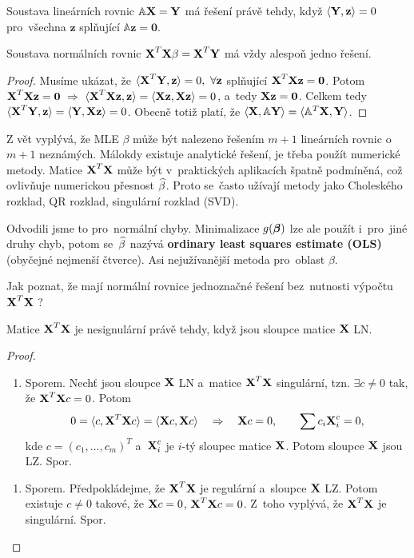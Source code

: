 \begin{lemma}
	Soustava lineárních rovnic $\mathbb{A}\textbf{X} = \textbf{Y}$ má řešení právě tehdy, když $\langle \textbf{Y},\textbf{z}\rangle = 0$ pro~všechna $\textbf{z}$ splňující $\mathbb{A}\textbf{z} = \textbf{0}$.
\end{lemma}
\begin{theorem}
	Soustava normálních rovnic $\textbf{X}^T\textbf{X}\beta = \textbf{X}^T\textbf{Y}$ má vždy alespoň jedno řešení.
	\begin{proof}
		Musíme ukázat, že $\langle \textbf{X}^T\textbf{Y},\textbf{z}\rangle = 0,~\forall\textbf{z}$ splňující $\textbf{X}^T\textbf{X}\textbf{z} = \textbf{0}$. Potom
		 $\textbf{X}^T\textbf{X}\textbf{z} = \textbf{0}~\Rightarrow~\langle \textbf{X}^T\textbf{X}\textbf{z},\textbf{z}\rangle = \langle \textbf{X}\textbf{z},\textbf{X}\textbf{z}\rangle = 0$, a~tedy $\textbf{X}\textbf{z} = \textbf{0}$. Celkem tedy $\langle\textbf{X}^T\textbf{Y},\textbf{z}\rangle = \langle\textbf{Y},\textbf{X}\textbf{z}\rangle = 0$. Obecně totiž platí, že $\langle \textbf{X},\mathbb{A}\textbf{Y}\rangle = \langle \mathbb{A}^T\textbf{X},\textbf{Y}\rangle$.
	\end{proof}
\end{theorem}
\begin{remark}
	Z vět vyplývá, že MLE $\beta$ může být nalezeno řešením $m+1$ lineárních rovnic o~$m+1$ neznámých. Málokdy existuje analytické řešení, je třeba použít numerické metody. Matice $\textbf{X}^T\textbf{X}$ může být v~praktických aplikacích špatně podmíněná, což ovlivňuje numerickou přesnost $\widehat{\beta}$. Proto se~často užívají metody jako Choleského rozklad, QR rozklad, singulární rozklad (SVD).
	
	Odvodili jsme to pro~normální chyby. Minimalizace $g(\boldsymbol{\beta})$ lze ale použít i~pro~jiné druhy chyb, potom se~$\widehat{\beta}$ nazývá \textbf{ordinary least squares estimate (OLS)} (obyčejné nejmenší čtverce). Asi nejužívanější metoda  pro~oblast $\beta$.
	
	Jak poznat, že mají normální rovnice jednoznačné řešení bez~nutnosti výpočtu $\textbf{X}^T\textbf{X}$ ?
\end{remark}
\begin{theorem}
	Matice $\textbf{X}^T\textbf{X}$ je nesignulární právě tehdy, když jsou sloupce matice $\textbf{X}$ LN.
	\begin{proof}
		\begin{enumerate}[$\Leftarrow$]
			\item Sporem. Nechť jsou sloupce $\textbf{X}$ LN a~matice $\textbf{X}^T\textbf{X}$ singulární, tzn. $\exists c\neq0$ tak, že $\textbf{X}^T\textbf{X} c = 0$. Potom
			 $$ 0 = \langle c,\textbf{X}^T\textbf{X} c\rangle = \langle \textbf{X} c,\textbf{X} c\rangle\quad \Rightarrow\quad\textbf{X} c = 0,\qquad\sum c_i\textbf{X}_i^c = 0, $$
			kde $c = (c_1,...,c_m)^T$ a~$\textbf{X}_i^c$ je $i$-tý sloupec matice $\textbf{X}$. Potom sloupce $\textbf{X}$ jsou LZ. Spor.
		\end{enumerate}
	\begin{enumerate}[$\Rightarrow$]
	\item Sporem. Předpokládejme, že $\textbf{X}^T\textbf{X}$ je regulární a~sloupce $\textbf{X}$ LZ. Potom existuje $c\neq0$ takové, že $\textbf{X} c = 0$, $\textbf{X}^T\textbf{X} c = 0$. Z~toho vyplývá, že $\textbf{X}^T\textbf{X}$ je singulární. Spor.
\end{enumerate}
	\end{proof}
\end{theorem}
